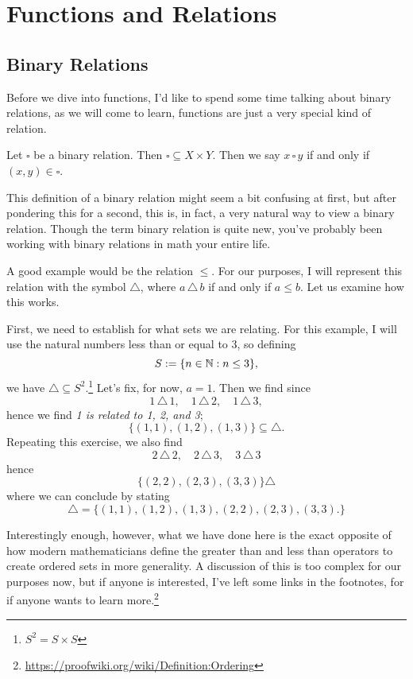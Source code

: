 \edef\mychapter{Functions and Relations}
\edef\mychapterdate{June 18, 2024}

\chapter{\mychapter}
\section{Binary Relations}
Before we dive into functions, I'd like to spend some time talking about binary relations, as we will come to learn, functions are just a very special kind of relation. 
\begin{define}
	Let $\square$ be a binary relation. Then $\square\subseteq X \times Y$.\footnotemark 
	Then we say $x \,\square\, y$ \footnotemark if and only if $(x,y)\in \square$.
\end{define}
\addtocounter{footnote}{1}

This definition of a binary relation might seem a bit confusing at first, but after pondering this for a second, this is, in fact, a very natural way to view a binary relation. 
Though the term binary relation is quite new, you've probably been working with binary relations in math your entire life. 

A good example would be the relation $\le$. For our purposes, I will represent this relation with the symbol $\triangle$, where
$a \,\triangle\, b$ if and only if $a\le b$.
Let us examine how this works.

First, we need to establish for what sets we are relating. For this example, I will use the natural numbers less than or equal to 3, so defining
$$S:=\{n\in\mathbb{N} : n \le 3\},$$
we have $\triangle \subseteq S^2$.\footnote{$S^2=S\times S$}
Let's fix, for now, $a=1$. 
Then we find since 
$$1 \,\triangle\,1, \quad 1 \,\triangle\,2, \quad 1 \,\triangle\,3,$$
hence we find \textit{1 is related to 1, 2, and 3}; 
$$\{(1,1),(1,2),(1,3)\}\subseteq \triangle.$$
Repeating this exercise, we also find
$$2 \,\triangle\,2, \quad 2 \,\triangle\,3, \quad 3 \,\triangle\,3$$
hence
$$\{(2,2),(2,3),(3,3)\} \triangle$$
where we can conclude by stating
$$\triangle=\{(1,1),(1,2),(1,3),(2,2),(2,3),(3,3).\}$$

Interestingly enough, however, what we have done here is the exact opposite of how modern mathematicians define the greater than and less than operators to create ordered sets in more generality. 
A discussion of this is too complex for our purposes now, but if anyone is interested, I've left some links in the footnotes, for if anyone wants to learn more.\footnote{\href{https://proofwiki.org/wiki/Definition:Ordering}{https://proofwiki.org/wiki/Definition:Ordering}}

